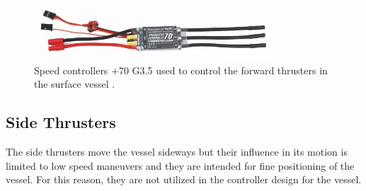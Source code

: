 \begin{figure}[H]
    \includegraphics[width=0.8\textwidth]{figures/ESC}
    \caption{Speed controllers +70 G\num{3,5} used to control the forward thrusters in the surface vessel \cite{ESC}.}
    \label{fig:ESC}
\end{figure}

\subsection{Side Thrusters}
The side thrusters move the vessel sideways but their influence in its motion is limited to low speed maneuvers and they are intended for fine positioning of the vessel. For this reason, they are not utilized in the controller design for the vessel.
